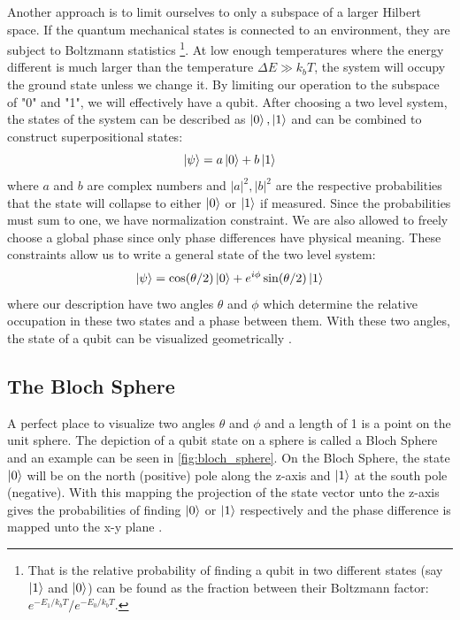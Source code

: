 Another approach is to limit ourselves to only a subspace of a larger Hilbert space. If the quantum mechanical states is connected to an environment, they are subject to Boltzmann statistics \footnote{That is the relative probability of finding a qubit in two different states (say $\ket{1}$ and $\ket{0}$) can be found as the fraction between their Boltzmann factor: $e^{-E_1 / k_b  T} / e^{- E_0 / k_b  T}$.}. At low enough temperatures where the energy different is much larger than the temperature $\Delta E \gg k_b T$, the system will occupy the ground state unless we change it. By limiting our operation to the subspace of "0" and "1", we will effectively have a qubit.
After choosing a two level system, the states of the system can be described as $\ket{0}, \ket{1}$ and can be combined to construct superpositional states:
\begin{equation}
    \ket{\psi} = a \ket{0} + b \ket{1}
\end{equation}
where $a$ and $b$ are complex numbers and $|a|^2, |b|^2$ are the respective probabilities that the state will collapse to either $\ket{0}$ or $\ket{1}$ if measured. Since the probabilities must sum to one, we have normalization constraint. We are also allowed to freely choose a global phase since only phase differences have physical meaning\cite{sakurai_modern_2021}. These constraints allow us to write a general state of the two level system:
\begin{equation}\label{eq:general_2_state}
    \ket{\psi} = \cos (\theta / 2) \ket{0} + e^{i\phi}\sin(\theta / 2)\ket{1}
\end{equation}
where our description have two angles $\theta$ and $\phi$ which determine the relative occupation in these two states and a phase between them. With these two angles, the state of a qubit can be visualized geometrically \cite{krantz_quantum_2019}.

\subsection{The Bloch Sphere}
A perfect place to visualize two angles $\theta$ and $\phi$ and a length of 1 is a point on the unit sphere. The depiction of a qubit state on a sphere is called a Bloch Sphere and an example can be seen in \ref{fig:bloch_sphere}. On the Bloch Sphere, the state $\ket{0}$ will be on the north (positive) pole along the z-axis and $\ket{1}$ at the south pole (negative). With this mapping the projection of the state vector unto the z-axis gives the probabilities of finding $\ket{0}$ or $\ket{1}$ respectively and the phase difference is mapped unto the x-y plane  \cite{krantz_week_2019}.


